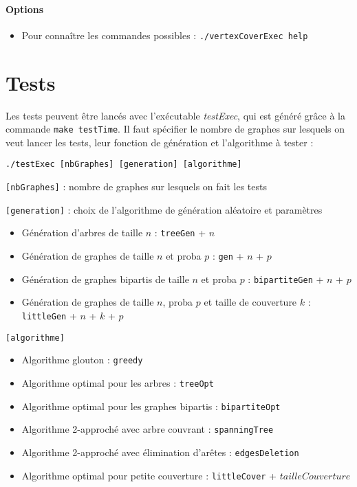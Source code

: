 \documentclass[a4paper,10pt]{article}
\newcommand*{\itemb}{\item[$\bullet$]}
\begin{document}
	\paragraph{Options}
	\begin{itemize}
	\item Pour connaître les commandes possibles : \texttt{./vertexCoverExec help}
	
	\end{itemize}

\section{Tests}
	Les tests peuvent être lancés avec l'exécutable \textit{testExec}, qui est généré grâce à la commande \texttt{make testTime}. Il faut spécifier le nombre de graphes sur lesquels on veut lancer les tests, leur fonction de génération et l'algorithme à tester :
	
	\bigskip
	\texttt{./testExec [nbGraphes] [generation] [algorithme]}
	
	\bigskip
	\texttt{[nbGraphes]} : nombre de graphes sur lesquels on fait les tests
	
	\bigskip
	\texttt{[generation]} : choix de l'algorithme de génération aléatoire et paramètres 
	\begin{itemize}
			\itemb Génération d'arbres de taille $n$ : \texttt{treeGen} + $n$
			\itemb Génération de graphes de taille $n$ et proba $p$ : \texttt{gen} + $n$ + $p$
			\itemb Génération de graphes bipartis de taille $n$ et proba $p$ : \texttt{bipartiteGen} + $n$ + $p$
			\itemb Génération de graphes de taille $n$, proba $p$ et taille de couverture $k$ : \texttt{littleGen} + $n$ + $k$ + $p$
	\end{itemize}
	
	\bigskip
	\texttt{[algorithme]}
	\begin{itemize}
		\item Algorithme glouton : \texttt{greedy}
		\item Algorithme optimal pour les arbres : \texttt{treeOpt}
		\item Algorithme optimal pour les graphes bipartis : \texttt{bipartiteOpt}
		\item Algorithme 2-approché avec arbre couvrant : \texttt{spanningTree}
		\item Algorithme 2-approché avec élimination d'arêtes : \texttt{edgesDeletion}
		\item Algorithme optimal pour petite couverture : \texttt{littleCover} + $tailleCouverture$
	\end{itemize}
	
\end{document}
